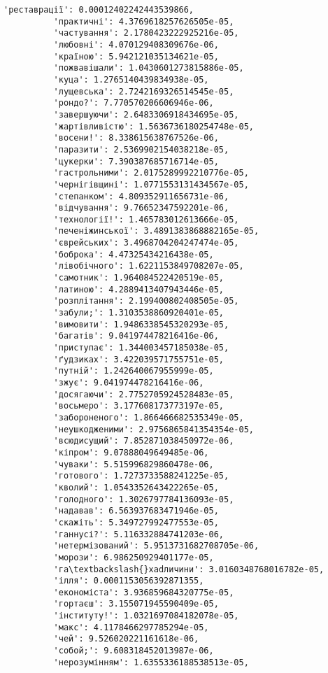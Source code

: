 \documentclass[11pt]{article}
\begin{document}
\begin{Verbatim}[commandchars=\\\{\}]
          'реставрації': 0.00012402242443539866,
          'практичні': 4.3769618257626505e-05,
          'частування': 2.1780423222925216e-05,
          'любовні': 4.070129408309676e-06,
          'країною': 5.942121035134621e-05,
          'пожвавішали': 1.0430601273815886e-05,
          'куца': 1.2765140439834938e-05,
          'лущевська': 2.7242169326514545e-05,
          'рондо?': 7.770570206606946e-06,
          'завершуючи': 2.6483306918434695e-05,
          'жартівливістю': 1.5636736180254748e-05,
          'восени!': 8.338615638767526e-06,
          'паразити': 2.5369902154038218e-05,
          'цукерки': 7.390387685716714e-05,
          'гастрольними': 2.0175289992210776e-05,
          'чернігівщині': 1.0771553131434567e-05,
          'степанком': 4.809352911656731e-06,
          'відчування': 9.76652347592201e-06,
          'технології!': 1.465783012613666e-05,
          'печеніжинської': 3.4891383868882165e-05,
          'єврейських': 3.4968704204247474e-05,
          'боброка': 4.47325434216438e-05,
          'лівобічного': 1.6221153849708207e-05,
          'самотник': 1.964084522420519e-05,
          'латиною': 4.2889413407943446e-05,
          'розплітання': 2.199400802408505e-05,
          'забули;': 1.3103538860920401e-05,
          'вимовити': 1.9486338545320293e-05,
          'багатів': 9.041974478216416e-06,
          'приступає': 1.344003457185038e-05,
          'ґудзиках': 3.422039571755751e-05,
          'путній': 1.242640067955999e-05,
          'зжує': 9.041974478216416e-06,
          'досягаючи': 2.7752705924528483e-05,
          'восьмеро': 3.177608173773197e-05,
          'забороненого': 1.866466682535349e-05,
          'неушкодженими': 2.9756865841354354e-05,
          'всюдисущий': 7.852871038450972e-06,
          'кіпром': 9.07888049649485e-06,
          'чуваки': 5.515996829860478e-06,
          'готового': 1.7273733588241225e-05,
          'кволий': 1.0543352643422265e-05,
          'голодного': 1.3026797784136093e-05,
          'надавав': 6.563937683471946e-05,
          'скажіть': 5.349727992477553e-05,
          'ганнусі?': 5.116332884741203e-06,
          'нетермізований': 5.9513731682708705e-06,
          'морози': 6.986250929401177e-05,
          'га\textbackslash{}xadличини': 3.0160348768016782e-05,
          'ілля': 0.0001153056392871355,
          'економіста': 3.936859684320775e-05,
          'гортаєш': 3.155071945590409e-05,
          'інституту!': 1.0321697084182078e-05,
          'макс': 4.1178466297785294e-05,
          'чей': 9.526020221161618e-06,
          'собой;': 9.608318452013987e-06,
          'нерозумінням': 1.6355336188538513e-05,

\end{Verbatim}
\end{document}
